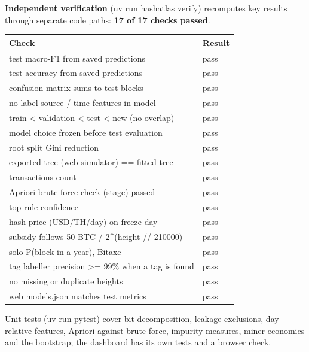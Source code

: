 \documentclass[
  11pt,
  a4paper,
]{article}
\newenvironment{reporttable}{\par\small\sffamily}{\par}
\newcommand{\code}[1]{{\ttfamily\color{ReportInkTwo}#1}}
\begin{document}
\textbf{Independent verification} (\code{uv run hashatlas verify})
recomputes key results through separate code paths: \textbf{17 of 17
checks passed}.

\begin{reporttable}

\begin{longtable}[]{@{}ll@{}}
\toprule\noalign{}
\textbf{Check} & \textbf{Result} \\
\midrule\noalign{}
\endhead
\bottomrule\noalign{}
\endlastfoot
test macro-F1 from saved predictions & pass \\
test accuracy from saved predictions & pass \\
confusion matrix sums to test blocks & pass \\
no label-source / time features in model & pass \\
train \textless{} validation \textless{} test \textless{} new (no
overlap) & pass \\
model choice frozen before test evaluation & pass \\
root split Gini reduction & pass \\
exported tree (web simulator) == fitted tree & pass \\
transactions count & pass \\
Apriori brute-force check (stage) passed & pass \\
top rule confidence & pass \\
hash price (USD/TH/day) on freeze day & pass \\
subsidy follows 50 BTC / 2\^{}(height // 210000) & pass \\
solo P(block in a year), Bitaxe & pass \\
tag labeller precision \textgreater= 99\% when a tag is found & pass \\
no missing or duplicate heights & pass \\
web models.json matches test metrics & pass \\
\end{longtable}

\end{reporttable}

Unit tests (\code{uv run pytest}) cover bit decomposition, leakage
exclusions, day-relative features, Apriori against brute force, impurity
measures, miner economics and the bootstrap; the dashboard has its own
tests and a browser check.

\end{document}
